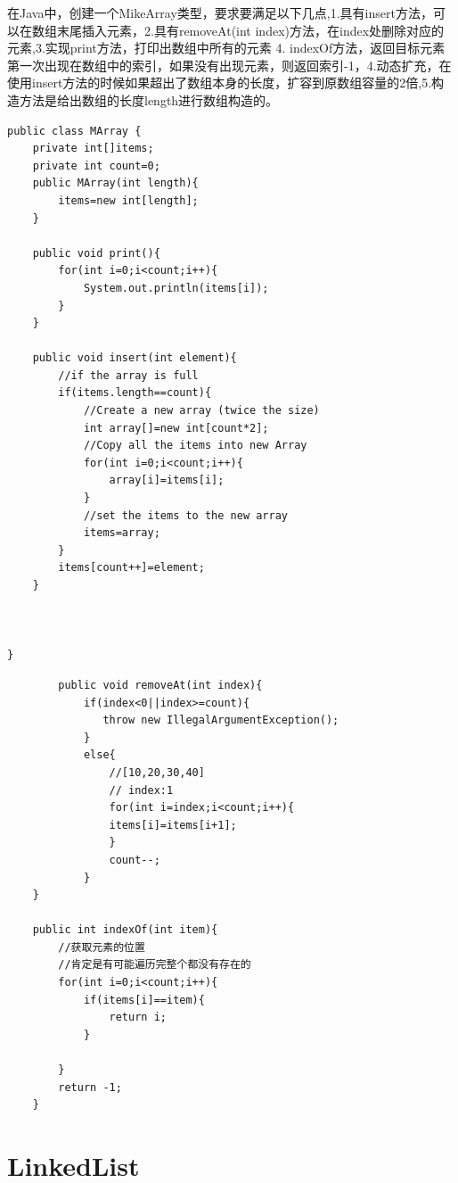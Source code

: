 \documentclass[
	11pt,
	fleqn,
	a4paper,
]{LegrandOrangeBook}
\begin{document}
\begin{example}
    在Java中，创建一个MikeArray类型，要求要满足以下几点,1.具有insert方法，可以在数组末尾插入元素，2.具有removeAt(int index)方法，在index处删除对应的元素,3.实现print方法，打印出数组中所有的元素 4. indexOf方法，返回目标元素第一次出现在数组中的索引，如果没有出现元素，则返回索引-1，4.动态扩充，在使用insert方法的时候如果超出了数组本身的长度，扩容到原数组容量的2倍,5.构造方法是给出数组的长度length进行数组构造的。
\end{example}
\begin{verbatim}
public class MArray {
    private int[]items;
    private int count=0;
    public MArray(int length){
        items=new int[length];
    }

    public void print(){
        for(int i=0;i<count;i++){
            System.out.println(items[i]);
        }
    }

    public void insert(int element){
        //if the array is full
        if(items.length==count){
            //Create a new array (twice the size)
            int array[]=new int[count*2];
            //Copy all the items into new Array
            for(int i=0;i<count;i++){
                array[i]=items[i];
            }
            //set the items to the new array
            items=array;
        }
        items[count++]=element;
    }



}

\end{verbatim}

\begin{verbatim}
	    public void removeAt(int index){
            if(index<0||index>=count){
               throw new IllegalArgumentException();
            }
            else{
                //[10,20,30,40]
                // index:1
                for(int i=index;i<count;i++){
                items[i]=items[i+1];
                }
                count--;
            }
    }

    public int indexOf(int item){
        //获取元素的位置
        //肯定是有可能遍历完整个都没有存在的
        for(int i=0;i<count;i++){
            if(items[i]==item){
                return i;
            }

        }
        return -1;
    }
\end{verbatim}

\chapter{LinkedList}
\end{document}
